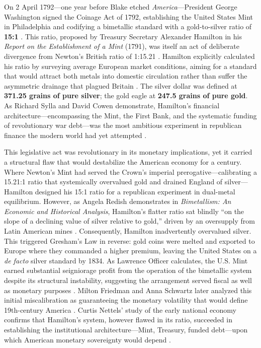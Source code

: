 \documentclass[
]{article}
\begin{document}
On 2 April 1792---one year before Blake etched
\emph{America}---President George Washington signed the Coinage Act of
1792, establishing the United States Mint in Philadelphia and codifying
a bimetallic standard with a gold-to-silver ratio of \textbf{15:1}
\citep{laughlin1898bimetallism}. This ratio, proposed by Treasury
Secretary Alexander Hamilton in his \emph{Report on the Establishment of
a Mint} (1791), was itself an act of deliberate divergence from Newton's
British ratio of 1:15.21 \citep{hamilton1791report}. Hamilton explicitly
calculated his ratio by surveying average European market conditions,
aiming for a standard that would attract both metals into domestic
circulation rather than suffer the asymmetric drainage that plagued
Britain \citep{sylla2011hamiltons}. The silver dollar was defined at
\textbf{371.25 grains of pure silver}; the gold eagle at \textbf{247.5
grains of pure gold}. As Richard Sylla and David Cowen demonstrate,
Hamilton's financial architecture---encompassing the Mint, the First
Bank, and the systematic funding of revolutionary war debt---was the
most ambitious experiment in republican finance the modern world had yet
attempted \citep{sylla2011hamiltons}.

This legislative act was revolutionary in its monetary implications, yet
it carried a structural flaw that would destabilize the American economy
for a century. Where Newton's Mint had served the Crown's imperial
prerogative---calibrating a 15.21:1 ratio that systemically overvalued
gold and drained England of silver---Hamilton designed his 15:1 ratio
for a republican experiment in dual-metal equilibrium. However, as
Angela Redish demonstrates in \emph{Bimetallism: An Economic and
Historical Analysis}, Hamilton's flatter ratio sat blindly ``on the
slope of a declining value of silver relative to gold,'' driven by an
oversupply from Latin American mines \citep{redish2000bimetallism}.
Consequently, Hamilton inadvertently overvalued silver. This triggered
Gresham's Law in reverse: gold coins were melted and exported to Europe
where they commanded a higher premium, leaving the United States on a
\emph{de facto} silver standard by 1834. As Lawrence Officer calculates,
the U.S. Mint earned substantial seigniorage profit from the operation
of the bimetallic system despite its structural instability, suggesting
the arrangement served fiscal as well as monetary purposes
\citep{officer2001bimetallism}. Milton Friedman and Anna Schwartz later
analyzed this initial miscalibration as guaranteeing the monetary
volatility that would define 19th-century America
\citep{friedman1963monetary}. Curtis Nettels' study of the early
national economy confirms that Hamilton's system, however flawed in its
ratio, succeeded in establishing the institutional architecture---Mint,
Treasury, funded debt---upon which American monetary sovereignty would
depend \citep{nettels1962emergence}.
\end{document}
